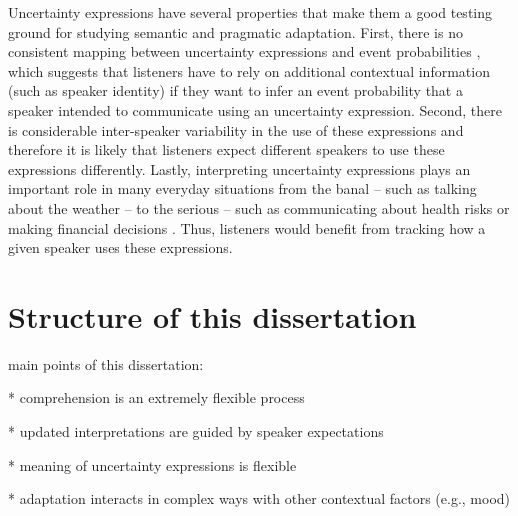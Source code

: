 Uncertainty expressions have several properties that make them a good testing ground for studying semantic and pragmatic
adaptation. First, there is no consistent mapping between uncertainty expressions and event probabilities \cite{e.g., Clark1990,Pepper1974}, 
which suggests that listeners have to rely on additional contextual information (such as speaker identity)
if they want to infer an event probability that a speaker intended to communicate using an uncertainty expression. Second, there is considerable inter-speaker variability 
in the use of these expressions \cite{Wallsten1986} and therefore it is likely that listeners expect different speakers to use these expressions
differently. Lastly, interpreting uncertainty expressions plays an important role in many everyday situations from the banal -- 
such as talking about the weather -- to the serious -- such as communicating about health risks 
\cite{Berry2004, Lipkus2007, Politi2007} or making financial decisions \cite{Doupnik2003}. 
Thus, listeners would benefit from tracking  how a given speaker uses these expressions. 

\section{Structure of this dissertation}

main points of this dissertation:

* comprehension is an extremely flexible process 

* updated interpretations are guided by speaker expectations

* meaning of uncertainty expressions is flexible

* adaptation interacts in complex ways with other contextual factors (e.g., mood)

